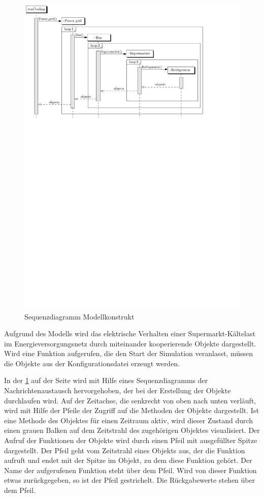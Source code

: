 \begin{figure}[h]
	\begin{center}
		\includegraphics[scale=0.8]{images/Theorie_Super/sequence_one}
	\end{center}
\caption{Sequenzdiagramm Modellkonstrukt}
\label{fig:uml_sequence}
\end{figure}

Aufgrund des Modells wird das elektrische Verhalten einer
Supermarkt-K\"altelast im Energieversorgungsnetz durch miteinander
kooperierende Objekte dargestellt. Wird eine Funktion aufgerufen, die den Start
der Simulation veranlasst, m\"ussen die Objekte aus der Konfigurationsdatei
erzeugt werden.

In der \cref{fig:uml_sequence} auf der Seite \pageref{fig:uml_sequence} wird mit
Hilfe eines Sequenzdiagramms der Nachrichtenaustausch hervorgehoben, der bei
der Erstellung der Objekte durchlaufen wird. Auf der Zeitachse, die senkrecht
von oben nach unten verl\"auft, wird mit Hilfe der Pfeile der Zugriff auf die
Methoden der Objekte dargestellt. Ist eine Methode des Objektes f\"ur einen
Zeitraum aktiv, wird dieser Zustand durch einen grauen Balken auf dem Zeitstrahl
des zugeh\"origen Objektes visualisiert. Der Aufruf der Funktionen der Objekte
wird durch einen Pfeil mit ausgef\"ullter Spitze dargestellt. Der Pfeil geht vom
Zeitstrahl eines Objekts aus, der die Funktion aufruft und endet mit der Spitze
im Objekt, zu dem diese Funktion geh\"ort. Der Name der aufgerufenen Funktion
steht \"uber dem Pfeil. Wird von dieser Funktion etwas zur\"uckgegeben, so ist
der Pfeil gestrichelt. Die R\"uckgabewerte stehen \"uber dem Pfeil.

